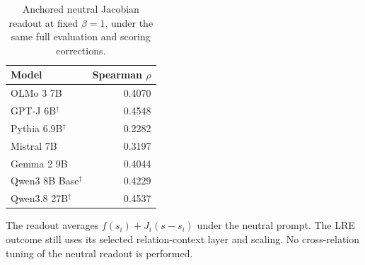 \begin{table}[t]
\centering\small
\caption{Anchored neutral Jacobian readout at fixed $\beta=1$, under the same full evaluation and scoring corrections.}
\label{tab:full-affine}
\begin{tabular}{@{}lr@{}}
\toprule
Model & Spearman $\rho$ \\
\midrule
OLMo 3 7B & 0.4070 \\
GPT-J 6B$^{\dagger}$ & 0.4548 \\
Pythia 6.9B$^{\dagger}$ & 0.2282 \\
Mistral 7B & 0.3197 \\
Gemma 2 9B & 0.4044 \\
Qwen3 8B Base$^{\dagger}$ & 0.4229 \\
Qwen3.8 27B$^{\dagger}$ & 0.4537 \\
\bottomrule
\end{tabular}
\par\smallskip\begin{minipage}{\linewidth}\footnotesize The readout averages $f(s_i)+J_i(s-s_i)$ under the neutral prompt. The LRE outcome still uses its selected relation-context layer and scaling. No cross-relation tuning of the neutral readout is performed.\end{minipage}
\end{table}
